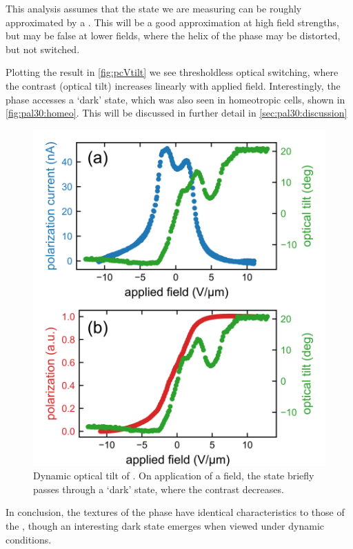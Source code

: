 \documentclass[aagreenthesis]{subfiles}
\begin{document}
This analysis assumes that the state we are measuring can be roughly
approximated by a \smcspf{}. This will be a good approximation at high field
strengths, but may be false at lower fields, where the helix of the \smcpalpha
phase may be distorted, but not switched.

Plotting the result in \autoref{fig:pcVtilt} we see thresholdless optical
switching, where the contrast (optical tilt) increases linearly with applied
field. Interestingly, the \smcpalpha phase accesses a `dark' state, which was
also seen in homeotropic cells, shown in \autoref{fig:pal30:homeo}. This will be
discussed in further detail in \autoref{sec:pal30:discussion}

\begin{figure}[h!]
    \centering
    \includegraphics[width=.8\textwidth]{figs/pal30/prc/PRCvsTilt/T108.png}
    \caption{\label{fig:pcVtilt} Dynamic optical tilt of \smcpalpha{}. On
    application of a field, the state briefly passes through a `dark' state,
where the contrast decreases.}
\end{figure}


In conclusion, the textures of the \smcpalpha{} phase have identical
characteristics to those of the \smcapa{}, though an interesting dark state
emerges when viewed under dynamic conditions. 
\end{document}
